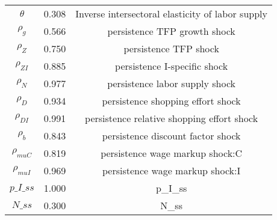 \begin{center}
\begin{longtable}{ccc}
${\theta}$ 	 & 	 0.308 	 & 	 Inverse intersectoral elasticity of labor supply\\
${\rho_g}$ 	 & 	 0.566 	 & 	 persistence TFP growth shock\\
${\rho_Z}$ 	 & 	 0.750 	 & 	 persistence TFP shock\\
${\rho_{ZI}}$ 	 & 	 0.885 	 & 	 persistence I-specific shock\\
${\rho_N}$ 	 & 	 0.977 	 & 	 persistence labor supply shock\\
${\rho_D}$ 	 & 	 0.934 	 & 	 persistence shopping effort shock\\
${\rho_{DI}}$ 	 & 	 0.991 	 & 	 persistence relative shopping effort shock\\
${\rho_b}$ 	 & 	 0.843 	 & 	 persistence discount factor shock\\
${\rho_{muC}}$ 	 & 	 0.819 	 & 	 persistence wage markup shock:C\\
${\rho_{muI}}$ 	 & 	 0.969 	 & 	 persistence wage markup shock:I\\
$p\_I\_ss$ 	 & 	 1.000 	 & 	 p\_I\_ss\\
$N\_ss$ 	 & 	 0.300 	 & 	 N\_ss\\
\bottomrule%
\end{longtable}
\end{center}
